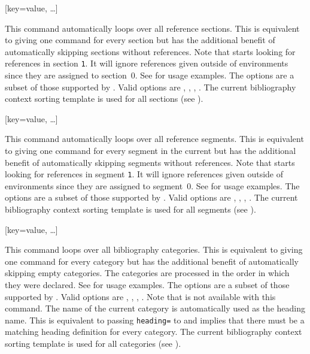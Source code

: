 \documentclass{ltxdockit}[2011/03/25]
\begin{document}
\begin{ltxsyntax}

[key=value, \dots]

This command automatically loops over all reference sections. This is equivalent to giving one  command for every section but has the additional benefit of automatically skipping sections without references. Note that  starts looking for references in section \texttt{1}. It will ignore references given outside of  environments since they are assigned to section~0. See  for usage examples. The options are a subset of those supported by . Valid options are , , , . The current bibliography context sorting template is used for all sections (see ).

[key=value, \dots]

This command automatically loops over all reference segments. This is equivalent to giving one  command for every segment in the current  but has the additional benefit of automatically skipping segments without references. Note that  starts looking for references in segment \texttt{1}. It will ignore references given outside of  environments since they are assigned to segment~0. See  for usage examples. The options are a subset of those supported by . Valid options are , , , . The current bibliography context sorting template is used for all segments (see ).

[key=value, \dots]

This command loops over all bibliography categories. This is equivalent to giving one  command for every category but has the additional benefit of automatically skipping empty categories. The categories are processed in the order in which they were declared. See  for usage examples. The options are a subset of those supported by . Valid options are , , , . Note that  is not available with this command. The name of the current category is automatically used as the heading name. This is equivalent to passing \texttt{heading=} to  and implies that there must be a matching heading definition for every category. The current bibliography context sorting template is used for all categories (see ).


\end{ltxsyntax}
\end{document}
